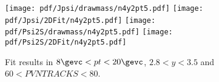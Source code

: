 \begin{figure}[H]
\begin{center}
\texttt{[image: pdf/Jpsi/drawmass/n4y2pt5.pdf]}
\texttt{[image: pdf/Jpsi/2DFit/n4y2pt5.pdf]}
\vspace*{-0.5cm}
\texttt{[image: pdf/Psi2S/drawmass/n4y2pt5.pdf]}
\texttt{[image: pdf/Psi2S/2DFit/n4y2pt5.pdf]}
\vspace*{-0.5cm}
\end{center}
\caption{Fit results in $8\gevc<pt<20\gevc$, $2.8<y<3.5$ and $60<PVNTRACKS<80$.}
\label{Fitn4y2pt5}
\end{figure}
